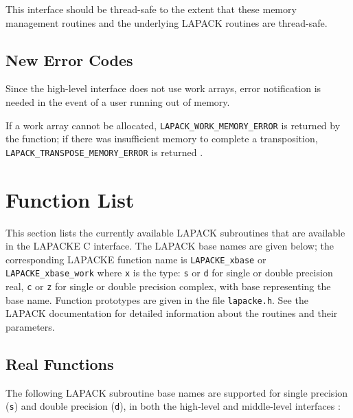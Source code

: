 This interface should be thread-safe to the extent that these memory management routines and the underlying LAPACK routines are thread-safe.

\subsection{New Error Codes}

Since the high-level interface does not use work arrays, error notification is needed in the event of a user running out of memory.

If a work array cannot be allocated, {\tt LAPACK\_WORK\_MEMORY\_ERROR} is returned by the function; if there was insufficient memory to complete a transposition,
{\tt LAPACK\_TRANSPOSE\_MEMORY\_ERROR} is returned
.

\section{Function List}

This section lists the currently available LAPACK subroutines that are available in the LAPACKE C interface. The LAPACK base names are given below; the corresponding LAPACKE function name is {\tt LAPACKE\_xbase} or {\tt LAPACKE\_xbase\_work} where {\tt x} is the type:
{\tt s} or {\tt d} for single or double precision real, {\tt c} or {\tt z} for single or double precision complex, with base representing the base name. Function prototypes are given in the file {\tt lapacke.h}. See the LAPACK documentation for detailed information about the routines and their parameters.

\subsection{Real Functions}

The following LAPACK subroutine base names are supported for single precision ({\tt s}) and double precision ({\tt d}), in both the high-level and middle-level interfaces
:

